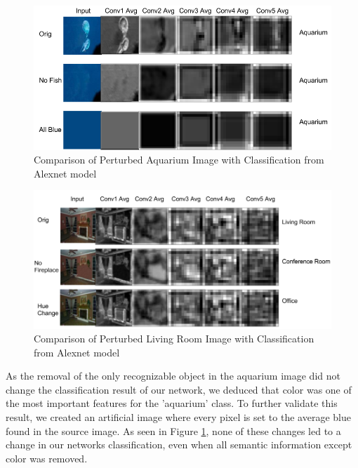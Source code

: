 \begin{figure}[tbp]
\centering
\includegraphics[width=\columnwidth]{figures/layer_summary/aquarium_fig}
\caption{Comparison of Perturbed Aquarium Image with Classification from Alexnet model}

\label{fig:aquarium_ls_fig}
\end{figure}

\begin{figure}[tbp]
\centering
\includegraphics[width=\columnwidth]{figures/layer_summary/living_room_fig}
\caption{Comparison of Perturbed Living Room Image with Classification from Alexnet model}

\label{fig:living_room_ls_fig}
\end{figure}

As the removal of the only recognizable object in the aquarium image did not change the classification result of our network, we deduced that color was one of the most important features for the 'aquarium' class. To further validate this result, we created an artificial image where every pixel is set to the average blue found in the source image. As seen in Figure \ref{fig:aquarium_ls_fig}, none of these changes led to a change in our networks classification, even when all semantic information except color was removed.

